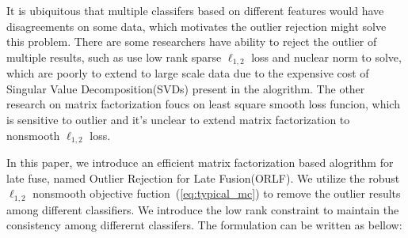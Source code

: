 \documentclass[letterpaper]{article}
\begin{document}


It is ubiquitous that multiple classifers based on different features would have disagreements on some data, which motivates the outlier rejection might solve this problem. There are some researchers have ability to reject the outlier of multiple results, such as \cite{gaoijcai2016robust} use low rank sparse $\ell_{1,2}$ loss and nuclear norm to solve, which are poorly to extend to large scale data due to the expensive cost of Singular Value Decomposition(SVDs) present in the alogrithm. The other research on matrix factorization foucs on least square smooth loss funcion, which is sensitive to outlier and it's unclear to extend matrix factorization to nonsmooth $\ell_{1,2}$ loss.

In this paper, we introduce an efficient matrix factorization based alogrithm for late fuse, named Outlier Rejection for Late Fusion(ORLF).
We utilize the robust $\ell_{1,2}$ nonsmooth objective fuction~(\ref{eq:typical_mc}) to remove the outlier results among different classifiers. We introduce the low rank constraint to maintain the consistency among differernt classifers.
The formulation can be written as bellow:
\end{document}

